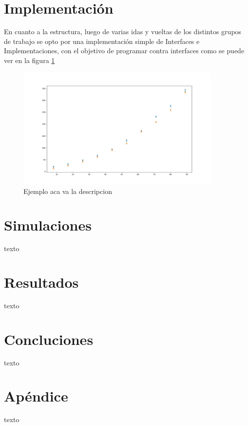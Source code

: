\documentclass{article}
\begin{document}
\section{Implementación}
En cuanto a la estructura, luego de varias idas y vueltas de los distintos grupos de trabajo se opto por una implementación simple de Interfaces e Implementaciones, con el objetivo de programar contra interfaces como se puede ver en la figura \ref{grafico}

\begin{figure}
\begin{center}
\includegraphics[width=4in]{./images/inputVsOutput.jpeg}
\caption{Ejemplo aca va la descripcion }
\label{grafico}
\end{center}
\end{figure}

\section{Simulaciones}
texto

\section{Resultados}
texto

\section{Concluciones}
texto

\section{Apéndice}
texto
\end{document}
